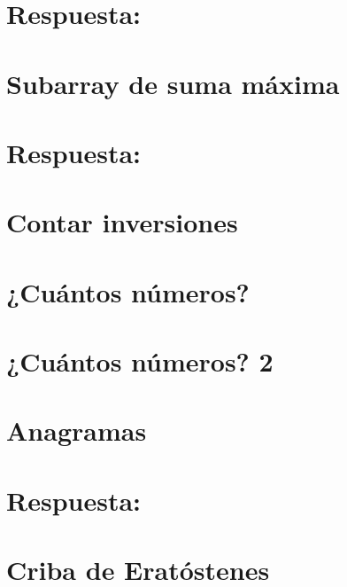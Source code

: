 \section*{Respuesta:}

\fi

\section{Subarray de suma máxima}

\ifshowanswers
\section*{Respuesta:}

\fi

\section{Contar inversiones}


\section{¿Cuántos números?}


\section{¿Cuántos números? 2}


\section{Anagramas}

\ifshowanswers
\section*{Respuesta:}

\fi

% 

\section{Criba de Eratóstenes}


